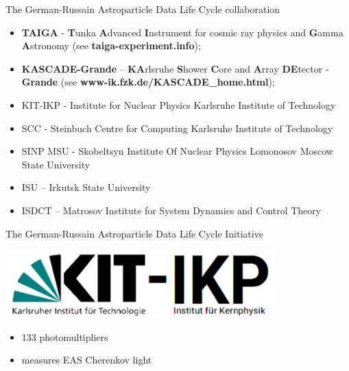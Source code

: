 \documentclass[18pt]{beamer}
\begin{document}


\appendix
\beginbackup

\begin{frame}
{The German-Russain Astroparticle Data Life Cycle collaboration}
    \begin{itemize}
	\item \textbf{\textcolor{kit-blue70}{TAIGA}} - \textbf{\textcolor{kit-blue70}{T}}unka \textbf{\textcolor{kit-blue70}{A}}dvanced
	\textbf{\textcolor{kit-blue70}{I}}nstrument for cosmic ray physics and \textbf{\textcolor{kit-blue70}{G}}amma
	\textbf{\textcolor{kit-blue70}{A}}stronomy (see \textbf{\textcolor{kit-blue70}{
	taiga-experiment.info}});
	\item \textbf{\textcolor{kit-orange70}{KASCADE-Grande}} -- \textbf{\textcolor{kit-orange70}{KA}}rlsruhe \textbf{\textcolor{kit-orange70}{S}}hower
	\textbf{\textcolor{kit-orange70}{C}}ore and \textbf{\textcolor{kit-orange70}{A}}rray \textbf{\textcolor{kit-orange70}{DE}}tector
	- \textbf{\textcolor{kit-orange70}{Grande}}
	(see \textbf{\textcolor{kit-blue70}{
	www-ik.fzk.de/KASCADE\_home.html}});
	\item KIT-IKP - Institute for Nuclear Physics Karlsruhe Institute of Technology
	\item SCC - Steinbuch Centre for Computing Karlsruhe Institute of Technology
	\item SINP MSU - Skobeltsyn Institute Of Nuclear Physics Lomonosov Moscow State University
	\item ISU -- Irkutsk State University
	\item ISDCT -- Matrosov Institute for System Dynamics and Control Theory
    \end{itemize}
\end{frame}

\begin{frame}{The German-Russain Astroparticle Data Life Cycle Initiative}
 \vspace{-2em}
\begin{minipage}[t]{0.41\textwidth}
    \parbox[c][0.20\textheight][t]{1\textwidth}{
      \centering
      \includegraphics[width=0.7742\textwidth]{pics/ikp-0.pdf}
    }
\vspace{-2em}
    \parbox[c][0.15\textheight][t]{1\textwidth}{
      \begin{itemize}
        \setlength{\itemsep}{0pt}
        \item 133 photomultipliers
        \item measures EAS Cherenkov light
      \end{itemize}
    }
\end{minipage}
\hfill
\end{frame}
\end{document}
